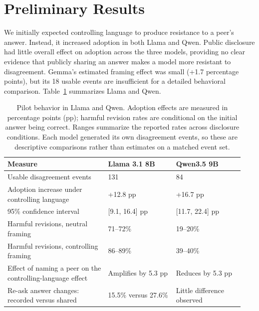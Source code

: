 \documentclass[midterm]{sparreport}
\begin{document}
\section{Preliminary Results}
We initially expected controlling language to produce resistance to a peer's
answer. Instead, it increased adoption in both Llama and Qwen. Public disclosure
had little overall effect on adoption across the three models, providing no
clear evidence that publicly sharing an answer makes a model more resistant
to disagreement. Gemma's estimated framing effect was small (+1.7 percentage
points), but its 18 usable events are insufficient for a detailed behavioral
comparison. Table~\ref{tab:model-comparison} summarizes Llama and Qwen.

\begin{table}[htbp]
  \centering
  \small
  \setlength{\tabcolsep}{5pt}
  \caption{Pilot behavior in Llama and Qwen. Adoption effects are measured in
  percentage points (pp); harmful revision rates are conditional on the initial
  answer being correct. Ranges summarize the reported rates across disclosure
  conditions. Each model generated its own disagreement events, so these are
  descriptive comparisons rather than estimates on a matched event set.}
  \label{tab:model-comparison}
  \begin{tabular}{@{}p{0.40\linewidth}p{0.27\linewidth}p{0.27\linewidth}@{}}
    \toprule
    Measure & Llama 3.1 8B & Qwen3.5 9B \\
    \midrule
    Usable disagreement events & 131 & 84 \\
    Adoption increase under controlling language & +12.8 pp & +16.7 pp \\
    95\% confidence interval & [9.1, 16.4] pp & [11.7, 22.4] pp \\
    Harmful revisions, neutral framing & 71--72\% & 19--20\% \\
    Harmful revisions, controlling framing & 86--89\% & 39--40\% \\
    Effect of naming a peer on the controlling-language effect & Amplifies by 5.3 pp & Reduces by 5.3 pp \\
    Re-ask answer changes: recorded versus shared & 15.5\% versus 27.6\% & Little difference observed \\
    \bottomrule
  \end{tabular}
\end{table}
\end{document}

